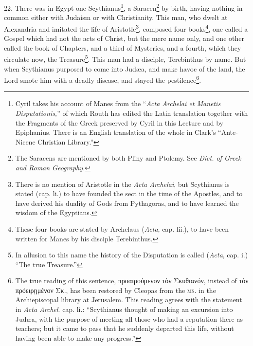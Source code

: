 22. There was in Egypt one Scythianus\footnote{Cyril takes his account of Manes from the “\emph{Acta Archelai et Manetis Disputationis,}” of which Routh has edited the Latin translation together with the Fragments of the Greek preserved by Cyril in this Lecture and by Epiphanius. There is an English translation of the whole in Clark’s “Ante-Nicene Christian Library.”}, a Saracen\footnote{The Saracens are mentioned by both Pliny and Ptolemy. See \emph{Dict. of Greek and Roman Geography.}} by birth, having nothing in common either with Judaism or with Christianity. This man, who dwelt at Alexandria and imitated the life of Aristotle\footnote{There is no mention of Aristotle in the \emph{Acta Archelai}, but Scythianus is stated (cap. li.) to have founded the sect in the time of the Apostles, and to have derived his duality of Gods from Pythagoras, and to have learned the wisdom of the Egyptians.}, composed four books\footnote{These four books are stated by Archelaus (\emph{Acta}, cap. lii.), to have been written for Manes by his disciple Terebinthus.}, one called a Gospel which had not the acts of Christ, but the mere name only, and one other called the book of Chapters, and a third of Mysteries, and a fourth, which they circulate now, the Treasure\footnote{In allusion to this name the history of the Disputation is called (\emph{Acta}, cap. i.) “The true Treasure.”}. This man had a disciple, Terebinthus by name. But when Scythianus purposed to come into Judæa, and make havoc of the land, the Lord smote him with a deadly disease, and stayed the pestilence\footnote{The true reading of this sentence, \textgreek{προαιρούμενον τὸν Σκυθιανόν}, instead of \textgreek{τὸν πρόειρῃμένον Σκ}., has been restored by Cleopas from the \textsc{ms.} in the Archiepiscopal library at Jerusalem. This reading agrees with the statement in \emph{Acta Archel}. cap. li.: “Scythianus thought of making an excursion into Judæa, with the purpose of meeting all those who had a reputation there as teachers; but it came to pass that he suddenly departed this life, without having been able to make any progress.”}.

